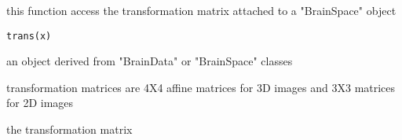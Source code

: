 \begin{Description}\relax
this function access the transformation matrix attached to a
"BrainSpace" object
\end{Description}
\begin{Usage}
\begin{verbatim}
trans(x)
\end{verbatim}
\end{Usage}
\begin{Arguments}
\begin{ldescription}
\item[\code{x}] an object derived from "BrainData" or "BrainSpace" classes 
\end{ldescription}
\end{Arguments}
\begin{Details}\relax
transformation matrices are 4X4 affine matrices for 3D images and 3X3
matrices for 2D images
\end{Details}
\begin{Value}
the transformation matrix
\end{Value}

